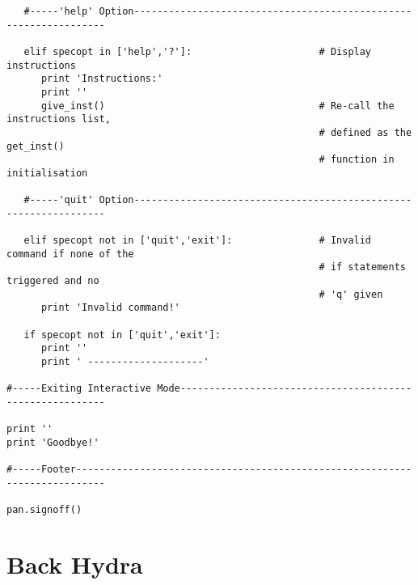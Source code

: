 \begin{verbatim}
   #-----'help' Option-----------------------------------------------------------------

   elif specopt in ['help','?']:                      # Display instructions
      print 'Instructions:'
      print ''
      give_inst()                                     # Re-call the instructions list,
                                                      # defined as the get_inst()
                                                      # function in initialisation

   #-----'quit' Option-----------------------------------------------------------------

   elif specopt not in ['quit','exit']:               # Invalid command if none of the
                                                      # if statements triggered and no
                                                      # 'q' given
      print 'Invalid command!'

   if specopt not in ['quit','exit']:
      print ''
      print ' --------------------'

#-----Exiting Interactive Mode---------------------------------------------------------

print ''
print 'Goodbye!'                                           

#-----Footer---------------------------------------------------------------------------

pan.signoff()

\end{verbatim}

\section{Back Hydra}

